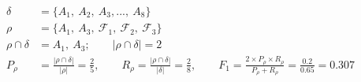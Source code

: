 

\begin{align*}
\delta&=\{A_1,~A_2,~A_3,...,~A_8\}\\
\rho&=\{A_1,~A_3,~\mathcal{F}_1,~\mathcal{F}_2,~\mathcal{F}_3\}\\
\rho \cap \delta &=A_1,~A_3; \qquad \left\lvert \rho \cap \delta \right\rvert=2\\
P_{\rho}&=\frac{\left\lvert \rho \cap \delta \right\rvert}{\left\lvert \rho \right\rvert} = \frac{2}{5},\qquad 
R_{\rho}=\frac{\left\lvert \rho \cap \delta \right\rvert}{\left\lvert \delta \right\rvert}= \frac{2}{8},\qquad
F_{1}=\frac{2 \times P_{\rho} \times R_{\rho}}{P_\rho + R_\rho}= \frac{0.2}{0.65}=0.307
\end{align*}
